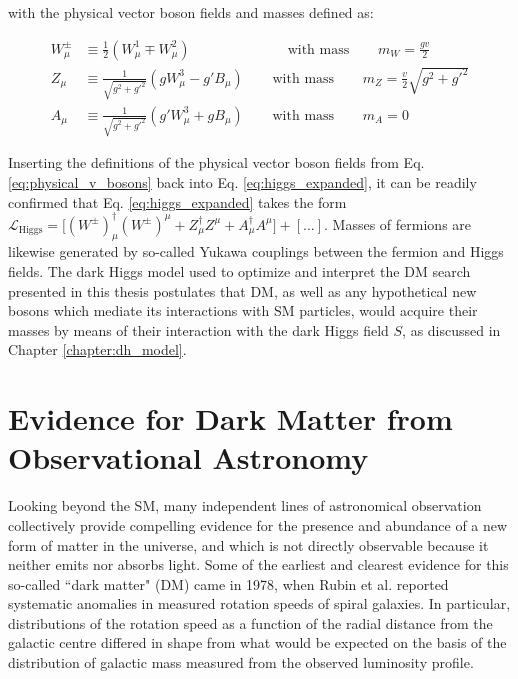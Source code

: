 \noindent with the physical vector boson fields and masses defined as:

\begin{equation}
\label{eq:physical_v_bosons}
\begin{split}
W^\pm_\mu & \equiv \frac{1}{2}(W_\mu^1 \mp W_\mu^2) \phantom{xxxxxxxxxlxx}\text{ with mass }\phantom{xxx} m_W=\frac{gv}{2} \\
Z_\mu & \equiv \frac{1}{\sqrt{g^2+g'^2}}(gW_\mu^3-g'B_\mu) \phantom{xxx}\text{ with mass }\phantom{xxx} m_Z = \frac{v}{2}\sqrt{g^2+g'^2} \\
A_\mu & \equiv \frac{1}{\sqrt{g^2+g'^2}}(g'W^3_\mu+gB_\mu) \phantom{xxx}\text{ with mass }\phantom{xxx} m_A = 0
\end{split}
\end{equation}

Inserting the definitions of the physical vector boson fields from Eq. \ref{eq:physical_v_bosons} back into Eq. \ref{eq:higgs_expanded}, it can be readily confirmed that Eq. \ref{eq:higgs_expanded} takes the form \(\mathcal{L}_\text{Higgs} = \big[(W^\pm)_\mu^\dagger(W^\pm)^\mu + Z_\mu^\dagger Z^\mu + A_\mu^\dagger A^\mu\big] + [...]\). Masses of fermions are likewise generated by so-called Yukawa couplings \cite{weinberg_1967} between the fermion and Higgs fields. The dark Higgs model used to optimize and interpret the DM search presented in this thesis postulates that DM, as well as any hypothetical new bosons which mediate its interactions with SM particles, would acquire their masses by means of their interaction with the dark Higgs field \(S\), as discussed in Chapter \ref{chapter:dh_model}. 


\section{Evidence for Dark Matter from Observational Astronomy}

Looking beyond the SM, many independent lines of astronomical observation collectively provide compelling evidence for the presence and abundance of a new form of matter in the universe, and which is not directly observable because it neither emits nor absorbs light. Some of the earliest and clearest evidence for this so-called ``dark matter" (DM) came in 1978, when Rubin et al. \cite{Rubin_et_al} reported systematic anomalies in measured rotation speeds of spiral galaxies. In particular, distributions of the rotation speed as a function of the radial distance from the galactic centre differed in shape from what would be expected on the basis of the distribution of galactic mass measured from the observed luminosity profile. 

